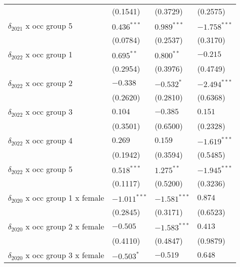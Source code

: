 \begin{tabular}{llll}
                                       &           (0.1541) &           (0.3729) &           (0.2575) \\
$\delta_{2021}$ x occ group 5          &      $0.436^{***}$ &      $0.989^{***}$ &     $-1.758^{***}$ \\
                                       &           (0.0784) &           (0.2537) &           (0.3170) \\
$\delta_{2022}$ x occ group 1          &       $0.695^{**}$ &       $0.800^{**}$ &           $-0.215$ \\
                                       &           (0.2954) &           (0.3976) &           (0.4749) \\
$\delta_{2022}$ x occ group 2          &           $-0.338$ &         $-0.532^*$ &     $-2.494^{***}$ \\
                                       &           (0.2620) &           (0.2810) &           (0.6368) \\
$\delta_{2022}$ x occ group 3          &            $0.104$ &           $-0.385$ &            $0.151$ \\
                                       &           (0.3501) &           (0.6500) &           (0.2328) \\
$\delta_{2022}$ x occ group 4          &            $0.269$ &            $0.159$ &     $-1.619^{***}$ \\
                                       &           (0.1942) &           (0.3594) &           (0.5485) \\
$\delta_{2022}$ x occ group 5          &      $0.518^{***}$ &       $1.275^{**}$ &     $-1.945^{***}$ \\
                                       &           (0.1117) &           (0.5200) &           (0.3236) \\
$\delta_{2020}$ x occ group 1 x female &     $-1.011^{***}$ &     $-1.581^{***}$ &            $0.874$ \\
                                       &           (0.2845) &           (0.3171) &           (0.6523) \\
$\delta_{2020}$ x occ group 2 x female &           $-0.505$ &     $-1.583^{***}$ &            $0.413$ \\
                                       &           (0.4110) &           (0.4847) &           (0.9879) \\
$\delta_{2020}$ x occ group 3 x female &         $-0.503^*$ &           $-0.519$ &            $0.648$ \\

\end{tabular}
